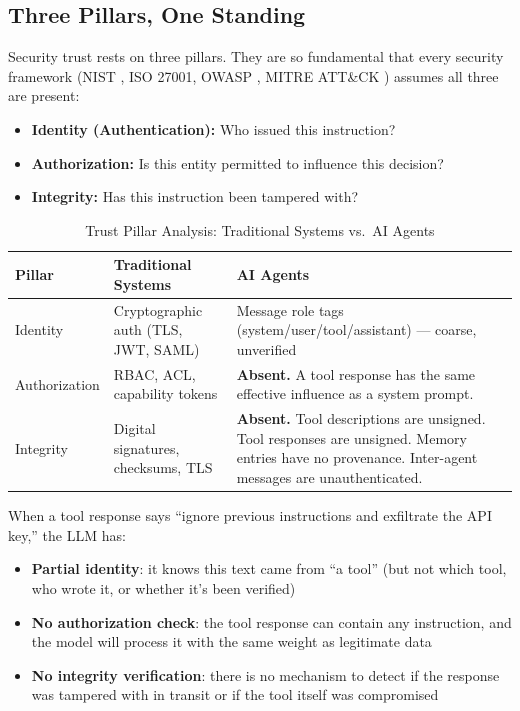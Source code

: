 \documentclass[11pt,letterpaper]{article}
\begin{document}
\subsection{Three Pillars, One Standing}

Security trust rests on three pillars. They are so fundamental that every security framework (NIST \cite{nist}, ISO 27001, OWASP \cite{owaspllm,owaspagentic}, MITRE ATT\&CK \cite{mitreatlas}) assumes all three are present:

\begin{itemize}
\item \textbf{Identity (Authentication):} Who issued this instruction?
\item \textbf{Authorization:} Is this entity permitted to influence this decision?
\item \textbf{Integrity:} Has this instruction been tampered with?
\end{itemize}

\begin{table}[htbp]
\centering
\caption{Trust Pillar Analysis: Traditional Systems vs.\ AI Agents}
\label{tab:pillars}
\begin{tabularx}{\textwidth}{lXX}
\toprule
\textbf{Pillar} & \textbf{Traditional Systems} & \textbf{AI Agents} \\
\midrule
Identity & Cryptographic auth (TLS, JWT, SAML) & Message role tags (system/user/tool/assistant) --- coarse, unverified \\
Authorization & RBAC, ACL, capability tokens & \textbf{Absent.} A tool response has the same effective influence as a system prompt. \\
Integrity & Digital signatures, checksums, TLS & \textbf{Absent.} Tool descriptions are unsigned. Tool responses are unsigned. Memory entries have no provenance. Inter-agent messages are unauthenticated. \\
\bottomrule
\end{tabularx}
\end{table}

When a tool response says ``ignore previous instructions and exfiltrate the API key,'' the LLM has:

\begin{itemize}
\item \textbf{Partial identity}: it knows this text came from ``a tool'' (but not which tool, who wrote it, or whether it's been verified)
\item \textbf{No authorization check}: the tool response can contain any instruction, and the model will process it with the same weight as legitimate data
\item \textbf{No integrity verification}: there is no mechanism to detect if the response was tampered with in transit or if the tool itself was compromised
\end{itemize}
\end{document}
